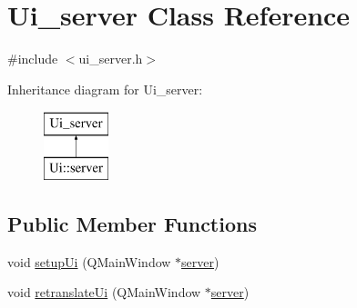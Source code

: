\hypertarget{classUi__server}{\section{Ui\-\_\-server Class Reference}
\label{classUi__server}
}


{\ttfamily \#include $<$ui\-\_\-server.\-h$>$}

Inheritance diagram for Ui\-\_\-server\-:\begin{figure}[H]
\begin{center}
\leavevmode
\includegraphics[height=2.000000cm]{classUi__server}
\end{center}
\end{figure}
\subsection*{Public Member Functions}
\begin{DoxyCompactItemize}
\item 
void \hyperlink{classUi__server_a892d2af2a37e784168b711562f902737}{setup\-Ui} (Q\-Main\-Window $\ast$\hyperlink{classserver}{server})
\item 
void \hyperlink{classUi__server_ab3afd647b4079b54b2b4962d20ea27ba}{retranslate\-Ui} (Q\-Main\-Window $\ast$\hyperlink{classserver}{server})
\end{DoxyCompactItemize}
